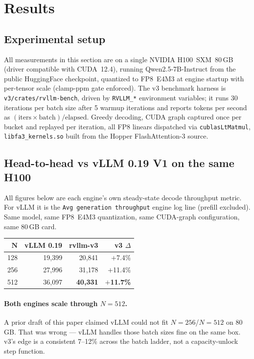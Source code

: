 \section{Results}
\label{sec:results}

\subsection{Experimental setup}

All measurements in this section are on a single NVIDIA H100~SXM~80\,GB
(driver compatible with CUDA~12.4), running Qwen2.5-7B-Instruct from the
public HuggingFace checkpoint, quantized to FP8~E4M3 at engine startup
with per-tensor scale (clamp-ppm gate enforced). The v3 benchmark harness
is \texttt{v3/crates/rvllm-bench}, driven by \texttt{RVLLM\_*} environment
variables; it runs 30 iterations per batch size after 5 warmup
iterations and reports tokens per second as
$(\text{iters} \times \text{batch}) / \text{elapsed}$. Greedy decoding,
CUDA graph captured once per bucket and replayed per iteration, all FP8
linears dispatched via \texttt{cublasLtMatmul},
\texttt{libfa3\_kernels.so} built from the Hopper FlashAttention-3
source.

\subsection{Head-to-head vs vLLM 0.19 V1 on the same H100}

All figures below are each engine's own steady-state decode
throughput metric. For vLLM it is the \texttt{Avg generation throughput}
engine log line (prefill excluded). Same model, same FP8~E4M3
quantization, same CUDA-graph configuration, same 80\,GB card.

\begin{tabular}{rrrr}
\toprule
$\boldsymbol{N}$ & \textbf{vLLM 0.19} & \textbf{rvllm-v3} & \textbf{v3 $\Delta$} \\
\midrule
128 & 19{,}399 & 20{,}841 & $+$7.4\% \\
256 & 27{,}996 & 31{,}178 & $+$11.4\% \\
512 & 36{,}097 & \textbf{40{,}331} & $+$\textbf{11.7\%} \\
\bottomrule
\end{tabular}

\paragraph{Both engines scale through $N\!=\!512$.}
A prior draft of this paper claimed vLLM could not fit
$N\!=\!256$/$N\!=\!512$ on 80\,GB. That was wrong --- vLLM handles
those batch sizes fine on the same box. v3's edge is a consistent
7--12\% across the batch ladder, not a capacity-unlock step function.

